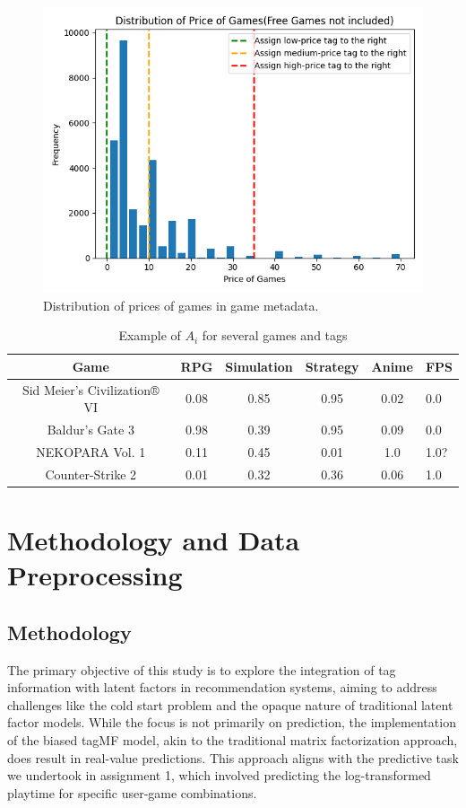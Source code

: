 \documentclass[sigplan,screen]{acmart}
\begin{document}
\begin{figure}[h]
  \centering
  \includegraphics[width=\linewidth]{price_hist.png}
  \caption{Distribution of prices of games in game metadata.}
\end{figure}

\begin{table}
  \caption{Example of $A_i$ for several games and tags}
  \label{tab:freq}
  \begin{tabular}{cccccl}
    \toprule
    Game & RPG & Simulation & Strategy & Anime & FPS\\
    \midrule
    Sid Meier’s Civilization® VI & 0.08 & 0.85 & 0.95 & 0.02 & 0.0\\
    Baldur's Gate 3 & 0.98 & 0.39 & 0.95 & 0.09 & 0.0\\
    NEKOPARA Vol. 1 & 0.11 & 0.45 & 0.01 & 1.0 & 1.0?\\
    Counter-Strike 2 & 0.01 & 0.32 & 0.36 & 0.06 & 1.0\\
  \bottomrule
\end{tabular}
\end{table}

\section{Methodology and Data Preprocessing}
\subsection{Methodology}
The primary objective of this study is to explore the integration of tag information with latent factors in recommendation systems, aiming to address challenges like the cold start problem and the opaque nature of traditional latent factor models. While the focus is not primarily on prediction, the implementation of the biased tagMF model\cite{LOEPP201921}, akin to the traditional matrix factorization approach\cite{Koren09}, does result in real-value predictions. This approach aligns with the predictive task we undertook in assignment 1, which involved predicting the log-transformed playtime for specific user-game combinations.
\end{document}
